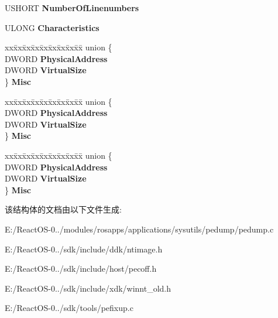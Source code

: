 \begin{DoxyCompactItemize}
U\+S\+H\+O\+RT {\bfseries Number\+Of\+Linenumbers}
\item 
\mbox{\label{struct___i_m_a_g_e___s_e_c_t_i_o_n___h_e_a_d_e_r_acf0a5b224b3e2fe6a4f89812b8bd8668}} 
U\+L\+O\+NG {\bfseries Characteristics}
\item 
\mbox{\label{struct___i_m_a_g_e___s_e_c_t_i_o_n___h_e_a_d_e_r_a393bbf310888f27bf527fa46969151fe}} 
\begin{tabbing}
xx\=xx\=xx\=xx\=xx\=xx\=xx\=xx\=xx\=\kill
union \{\\
\>DWORD {\bfseries PhysicalAddress}\\
\>DWORD {\bfseries VirtualSize}\\
\} {\bfseries Misc}\\

\end{tabbing}\item 
\mbox{\label{struct___i_m_a_g_e___s_e_c_t_i_o_n___h_e_a_d_e_r_a56c8a237389cf614fa04015a0b5adb7d}} 
\begin{tabbing}
xx\=xx\=xx\=xx\=xx\=xx\=xx\=xx\=xx\=\kill
union \{\\
\>DWORD {\bfseries PhysicalAddress}\\
\>DWORD {\bfseries VirtualSize}\\
\} {\bfseries Misc}\\

\end{tabbing}\item 
\mbox{\label{struct___i_m_a_g_e___s_e_c_t_i_o_n___h_e_a_d_e_r_a28cc47fa6403182d8398b4a2880d72c6}} 
\begin{tabbing}
xx\=xx\=xx\=xx\=xx\=xx\=xx\=xx\=xx\=\kill
union \{\\
\>DWORD {\bfseries PhysicalAddress}\\
\>DWORD {\bfseries VirtualSize}\\
\} {\bfseries Misc}\\

\end{tabbing}\end{DoxyCompactItemize}


该结构体的文档由以下文件生成\+:\begin{DoxyCompactItemize}
\item 
E\+:/\+React\+O\+S-\/0../modules/rosapps/applications/sysutils/pedump/pedump.\+c\item 
E\+:/\+React\+O\+S-\/0../sdk/include/ddk/ntimage.\+h\item 
E\+:/\+React\+O\+S-\/0../sdk/include/host/pecoff.\+h\item 
E\+:/\+React\+O\+S-\/0../sdk/include/xdk/winnt\+\_\+old.\+h\item 
E\+:/\+React\+O\+S-\/0../sdk/tools/pefixup.\+c\end{DoxyCompactItemize}
